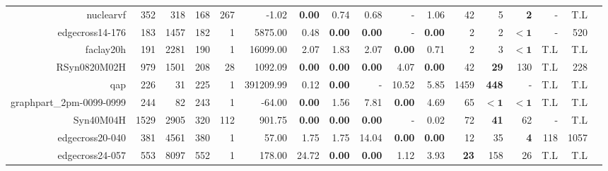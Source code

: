 \begin{table*}[t]
\begin{tabular}{|r|r|r|r|r||r||r|r|r|r|r||r|r|r|r|r|r|}
                        nuclearvf &          352 &          318 &         168 &         267 &             -1.02 & \textbf{0.00} &         0.74 &          0.68 &             - &          1.06 &           42 &                  5 &         \textbf{2} &            - &          T.L \\ 
                  edgecross14-176 &          183 &         1457 &         182 &           1 &           5875.00 &          0.48 &\textbf{0.00} & \textbf{0.00} &             - & \textbf{0.00} &            2 &                  2 &         $\bm{< 1}$ &            - &          520 \\ 
                        faclay20h &          191 &         2281 &         190 &           1 &          16099.00 &          2.07 &         1.83 &          2.07 & \textbf{0.00} &          0.71 &            2 &                  3 &         $\bm{< 1}$ &          T.L &          T.L \\ 
                     RSyn0820M02H &          979 &         1501 &         208 &          28 &           1092.09 & \textbf{0.00} &\textbf{0.00} & \textbf{0.00} &          4.07 & \textbf{0.00} &           42 &        \textbf{29} &                130 &          T.L &          228 \\ 
                              qap &          226 &           31 &         225 &           1 &         391209.99 &          0.12 &\textbf{0.00} &             - &         10.52 &          5.85 &         1459 &       \textbf{448} &                  - &          T.L &          T.L \\ 
         graphpart\_2pm-0099-0999 &          244 &           82 &         243 &           1 &            -64.00 & \textbf{0.00} &         1.56 &          7.81 & \textbf{0.00} &          4.69 &           65 &         $\bm{< 1}$ &         $\bm{< 1}$ &          T.L &          T.L \\ 
                        Syn40M04H &         1529 &         2905 &         320 &         112 &            901.75 & \textbf{0.00} &\textbf{0.00} & \textbf{0.00} &             - &          0.02 &           72 &        \textbf{41} &                 62 &            - &          T.L \\ 
                  edgecross20-040 &          381 &         4561 &         380 &           1 &             57.00 &          1.75 &         1.75 &         14.04 & \textbf{0.00} & \textbf{0.00} &           12 &                 35 &         \textbf{4} &          118 &         1057 \\ 
                  edgecross24-057 &          553 &         8097 &         552 &           1 &            178.00 &         24.72 &\textbf{0.00} & \textbf{0.00} &          1.12 &          3.93 &  \textbf{23} &                158 &                 26 &          T.L &          T.L \\ 
\hline 
\end{tabular}\\ 
\label{table:results} 
\end{table*} 
